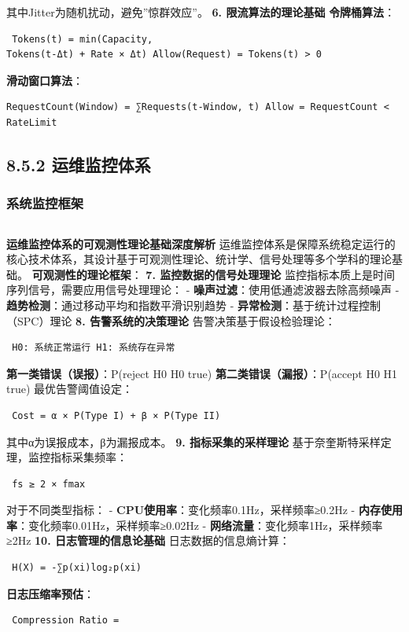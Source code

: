 {其中Jitter为随机扰动，避免''惊群效应''。 \textbf{6. 限流算法的理论基础} \textbf{令牌桶算法}： \begin{lstlisting} Tokens(t) = min(Capacity,
Tokens(t-Δt) + Rate × Δt) Allow(Request) = Tokens(t) > 0 \end{lstlisting} \textbf{滑动窗口算法}： \begin{lstlisting}
RequestCount(Window) = ∑Requests(t-Window, t) Allow = RequestCount < RateLimit \end{lstlisting} \subsection{8.5.2
运维监控体系}\label{ux8fd0ux7ef4ux76d1ux63a7ux4f53ux7cfb} \subsubsection{系统监控框架}\label{ux7cfbux7edfux76d1ux63a7ux6846ux67b6}
\begin{lstlisting}[language=Python] \end{lstlisting} \textbf{运维监控体系的可观测性理论基础深度解析}
运维监控体系是保障系统稳定运行的核心技术体系，其设计基于可观测性理论、统计学、信号处理等多个学科的理论基础。 \textbf{可观测性的理论框架}： \textbf{7. 监控数据的信号处理理论}
监控指标本质上是时间序列信号，需要应用信号处理理论： - \textbf{噪声过滤}：使用低通滤波器去除高频噪声 - \textbf{趋势检测}：通过移动平均和指数平滑识别趋势 - \textbf{异常检测}：基于统计过程控制（SPC）理论
\textbf{8. 告警系统的决策理论} 告警决策基于假设检验理论： \begin{lstlisting} H0: 系统正常运行 H1: 系统存在异常 \end{lstlisting}
\textbf{第一类错误（误报）}：P(reject H0 \textbar{} H0 true) \textbf{第二类错误（漏报）}：P(accept H0 \textbar{} H1 true) 最优告警阈值设定：
\begin{lstlisting} Cost = α × P(Type I) + β × P(Type II) \end{lstlisting} 其中α为误报成本，β为漏报成本。 \textbf{9. 指标采集的采样理论}
基于奈奎斯特采样定理，监控指标采集频率： \begin{lstlisting} fs ≥ 2 × fmax \end{lstlisting} 对于不同类型指标： - \textbf{CPU使用率}：变化频率0.1Hz，采样频率≥0.2Hz
- \textbf{内存使用率}：变化频率0.01Hz，采样频率≥0.02Hz - \textbf{网络流量}：变化频率1Hz，采样频率≥2Hz \textbf{10. 日志管理的信息论基础} 日志数据的信息熵计算：
\begin{lstlisting} H(X) = -∑p(xi)log₂p(xi) \end{lstlisting} \textbf{日志压缩率预估}： \begin{lstlisting} Compression Ratio =

\end{lstlisting}}
